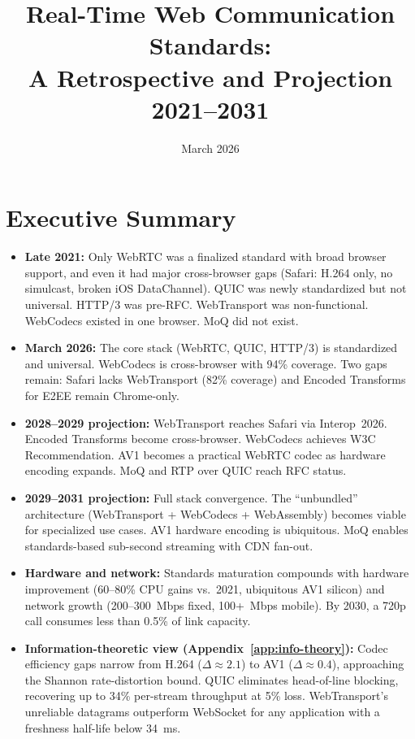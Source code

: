 \documentclass[11pt]{article}
\title{Real-Time Web Communication Standards:\\A Retrospective and Projection\\2021--2031}
\author{}
\date{March 2026}
\begin{document}
\maketitle

\tableofcontents
\listoffigures
\listoftables
\newpage

\section*{Executive Summary}

\begin{itemize}
  \item \textbf{Late 2021:} Only WebRTC was a finalized standard with broad
    browser support, and even it had major cross-browser gaps (Safari: H.264
    only, no simulcast, broken iOS DataChannel). QUIC was newly standardized
    but not universal. HTTP/3 was pre-RFC. WebTransport was non-functional.
    WebCodecs existed in one browser. MoQ did not exist.

  \item \textbf{March 2026:} The core stack (WebRTC, QUIC, HTTP/3) is
    standardized and universal. WebCodecs is cross-browser with 94\% coverage.
    Two gaps remain: Safari lacks WebTransport (82\% coverage) and Encoded
    Transforms for E2EE remain Chrome-only.

  \item \textbf{2028--2029 projection:} WebTransport reaches Safari via
    Interop~2026. Encoded Transforms become cross-browser. WebCodecs achieves
    W3C Recommendation. AV1 becomes a practical WebRTC codec as hardware
    encoding expands. MoQ and RTP over QUIC reach RFC status.

  \item \textbf{2029--2031 projection:} Full stack convergence. The
    ``unbundled'' architecture (WebTransport + WebCodecs + WebAssembly) becomes
    viable for specialized use cases. AV1 hardware encoding is ubiquitous.
    MoQ enables standards-based sub-second streaming with CDN fan-out.

  \item \textbf{Hardware and network:} Standards maturation compounds with
    hardware improvement (60--80\% CPU gains vs.\ 2021, ubiquitous AV1 silicon)
    and network growth (200--300~Mbps fixed, 100+~Mbps mobile). By 2030, a
    720p call consumes less than 0.5\% of link capacity.

  \item \textbf{Information-theoretic view (Appendix~\ref{app:info-theory}):}
    Codec efficiency gaps narrow from H.264 ($\Delta \approx 2.1$) to AV1
    ($\Delta \approx 0.4$), approaching the Shannon rate-distortion bound.
    QUIC eliminates head-of-line blocking, recovering up to 34\% per-stream
    throughput at 5\% loss. WebTransport's unreliable datagrams outperform
    WebSocket for any application with a freshness half-life below 34~ms.
\end{itemize}
\end{document}
